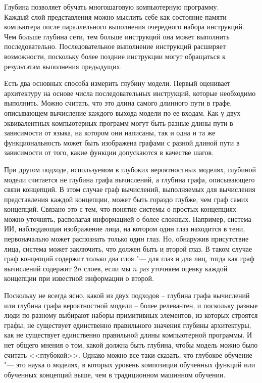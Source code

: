 \documentclass[bachelor, och, coursework]{SCWorks}
\begin{document}
        Глубина позволяет обучать многошаговую компьютерную программу. \\Каждый
        слой представления можно мыслить себе как состояние памяти компьютера
        после параллельного выполнения очередного набора инструкций. Чем больше
        глубина сети, тем больше инструкций она может выполнить последовательно.
        Последовательное выполнение инструкций расширяет возможности, поскольку
        более поздние инструкции могут обращаться к результатам выполнения
        предыдущих.
        
        Есть два основных способа измерить глубину модели. Первый оценивает
        архитектуру на основе числа последовательных инструкций, которые
        необходимо выполнить. Можно считать, что это длина самого длинного пути
        в графе, описывающем вычисление каждого выхода модели по ее входам. Как
        у двух эквивалентных компьютерных программ могут быть разные длины пути
        в зависимости от языка, на котором они написаны, так и одна и та же
        функциональность может быть изображена графами с разной длиной пути в
        зависимости от того, какие функции допускаются в качестве шагов. 

        При другом подходе, используемом в глубоких вероятностных моделях,
        глубиной модели считается не глубина графа вычислений, а глубина графа,
        описывающего связи концепций. В этом случае граф вычислений, выполняемых
        для вычисления представления каждой концепции, может быть гораздо
        глубже, чем граф самих концепций. Связано это с тем, что понятие системы
        о простых концепциях можно уточнять, располагая информацией о более
        сложных. Например, система ИИ, наблюдающая изображение лица, на котором
        один глаз находится в тени, первоначально может распознать только один
        глаз. Но, обнаружив присутствие лица, система может заключить, что
        должен быть и второй глаз. В таком случае граф концепций содержит только
        два слоя "--- для глаз и для лиц, тогда как граф вычислений содержит
        $2n$ слоев, если мы $n$ раз уточняем оценку каждой концепции при
        известной информации о второй.

        Поскольку не всегда ясно, какой из двух подходов – глубина графа
        вычислений или глубина графа вероятностной модели – более релевантен, и
        поскольку разные люди по-разному выбирают наборы примитивных элементов,
        из которых строятся графы, не существует единственно правильного
        значения глубины архитектуры, как не существует единственно правильной
        длины компьютерной программы. И нет общего мнения о том, какой должна
        быть глубина, чтобы модель можно было считать <<глубокой>>. Однако можно
        все-таки сказать, что глубокое обучение "--- это наука о моделях, в
        которых уровень композиции обученных функций или обученных концепций
        выше, чем в традиционном машинном обучении.
\end{document}
